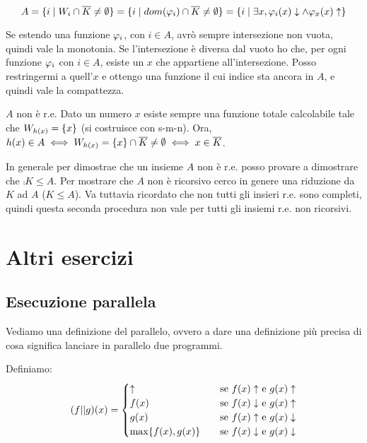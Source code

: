 \begin{equation*}
    A = \{ i \mid W_{i} \cap \overline{K} \not= \emptyset\} = \{ i \mid dom(\varphi_{i}) \cap \overline{K}
    \not= \emptyset \} = \{ i \mid \exists x, \varphi_{i}(x) \downarrow \land \varphi_{x}(x) \uparrow\}
\end{equation*}

Se estendo una funzione $\varphi_{i}$, con $i \in A$, avrò sempre intersezione non vuota, quindi vale la
monotonia. Se l'intersezione è diversa dal vuoto ho che, per ogni funzione $\varphi_{i}$ con $i \in A$,
esiste un $x$ che appartiene all'intersezione. Posso restringermi a quell'$x$ e ottengo una funzione
il cui indice sta ancora in $A$, e quindi vale la compattezza.

$A$ non è r.e. Dato un numero $x$ esiste sempre una funzione totale calcolabile tale che $W_{h(x)}
= \{x\}$ (si costruisce con s-m-n). Ora, $h(x) \in A \iff W_{h(x)} = \{x\} \cap \overline{K} \not=
\emptyset \iff x \in \overline{K}$.

In generale per dimostrae che un insieme $A$ non è r.e. posso provare a dimostrare che $\comp{K}
\leq A$. Per mostrare che $A$ non è ricorsivo cerco in genere una riduzione da $K$ ad $A$ ($K \leq
A$). Va tuttavia ricordato che non tutti gli insieri r.e. sono completi, quindi questa seconda
procedura non vale per tutti gli insiemi r.e. non ricorsivi.

\section{Altri esercizi}

\subsection{Esecuzione parallela}

Vediamo una definizione del parallelo, ovvero a dare una definizione più precisa di cosa significa
lanciare in parallelo due programmi.

Definiamo:
\begin{equation*}
    (f || g)(x) =
    \begin{cases}
        \uparrow \quad &\text{se $f(x) \uparrow$ e $g(x) \uparrow$} \\
        f(x) \quad &\text{se $f(x) \downarrow$ e $g(x) \uparrow$} \\
        g(x) \quad &\text{se $f(x) \uparrow$ e $g(x) \downarrow$} \\
        \max\{f(x),g(x)\} \quad &\text{se $f(x) \downarrow$ e $g(x) \downarrow$}
    \end{cases}
\end{equation*}

